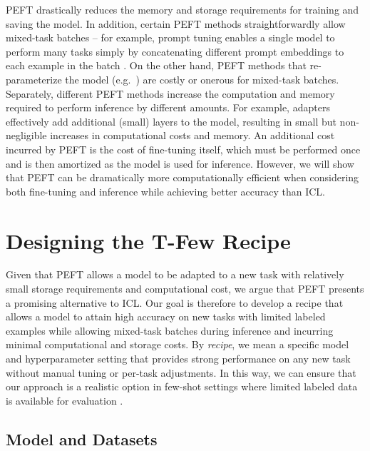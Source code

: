 \documentclass{article}
\newcommand{\tfew}{{\fontfamily{lmtt}\selectfont T-Few}\xspace}
\begin{document}
PEFT drastically reduces the memory and storage requirements for training and saving the model.
In addition, certain PEFT methods straightforwardly allow mixed-task batches -- for example, prompt tuning enables a single model to perform many tasks simply by concatenating different prompt embeddings to each example in the batch \cite{lester2021power}.
On the other hand, PEFT methods that re-parameterize the model (e.g.\ \citep{aghajanyan2020intrinsic,hu2021lora}) are costly or onerous for mixed-task batches.
Separately, different PEFT methods increase the computation and memory required to perform inference by different amounts.
For example, adapters effectively add additional (small) layers to the model, resulting in small but non-negligible increases in computational costs and memory.
An additional cost incurred by PEFT is the cost of fine-tuning itself, which must be performed once and is then amortized as the model is used for inference.
However, we will show that PEFT can be dramatically more computationally efficient when considering both fine-tuning and inference while achieving better accuracy than ICL. 

\section{Designing the \tfew Recipe}
\label{sec:tfew}

Given that PEFT allows a model to be adapted to a new task with relatively small storage requirements and computational cost, we argue that PEFT presents a promising alternative to ICL.
Our goal is therefore to develop a recipe that allows a model to attain high accuracy on new tasks with limited labeled examples while allowing mixed-task batches during inference and incurring minimal computational and storage costs.
By \textit{recipe}, we mean a specific model and hyperparameter setting that provides strong performance on any new task without manual tuning or per-task adjustments.
In this way, we can ensure that our approach is a realistic option in few-shot settings where limited labeled data is available for evaluation \cite{perez2021true,oliver2018realistic}.

\subsection{Model and Datasets}
\label{sec:model_datasets}
\end{document}
